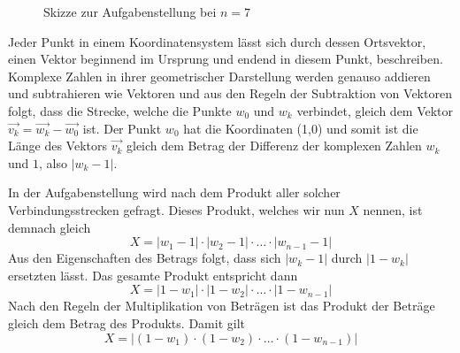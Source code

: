\documentclass[a4paper,12pt]{article} %
\begin{document}
\begin{figure}
\begin{center}
		
		
		\caption{Skizze zur Aufgabenstellung bei $n=7$}
		
		
	\end{center}
\end{figure}




Jeder Punkt in einem Koordinatensystem lässt sich durch dessen Ortsvektor, einen Vektor beginnend im Ursprung und endend in diesem Punkt, beschreiben. Komplexe Zahlen in ihrer geometrischer Darstellung werden genauso addieren und subtrahieren wie Vektoren und aus den Regeln der Subtraktion von Vektoren folgt, dass die Strecke, welche die Punkte $w_0$ und $w_k$ verbindet, gleich dem Vektor $\vec{v_k}=\vec{w_k}-\vec{w_0}$ ist.
Der Punkt $w_0$ hat die Koordinaten (1,0) und somit ist die Länge des Vektors $\vec{v_k}$ gleich dem Betrag der Differenz der komplexen Zahlen $w_k$ und $1$, also $|w_k-1|$.


In der Aufgabenstellung wird nach dem Produkt aller solcher Verbindungsstrecken gefragt.
Dieses Produkt, welches wir nun $X$ nennen, ist demnach gleich
\[X = |w_1-1|\cdot|w_2-1|\cdot\ldots\cdot|w_{n-1}-1|\]
Aus den Eigenschaften des Betrags folgt, dass sich $|w_k-1|$ durch $|1-w_k|$ ersetzten lässt.
Das gesamte Produkt entspricht dann
\[X=|1-w_1|\cdot|1-w_2|\cdot\ldots\cdot|1-w_{n-1}|\]
Nach den Regeln der Multiplikation von Beträgen ist das Produkt der Beträge gleich dem Betrag des Produkts. Damit gilt
\begin{equation}\label{X}
	X=|(1-w_1)\cdot(1-w_2)\cdot\ldots\cdot(1-w_{n-1})|
\end{equation}
\end{document}
